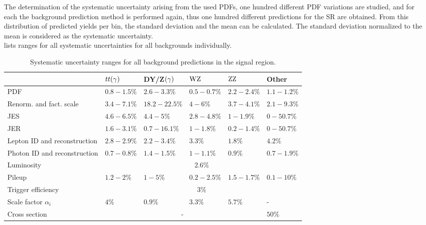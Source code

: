 The determination of the systematic uncertainty arising from the used PDFs, one hundred different PDF variations are studied, and for each the background prediction method is performed again, thus one hundred different predictions for the SR are obtained. From this distribution of predicted yields per bin, the standard deviation and the mean can be calculated. The standard deviation normalized to the mean is considered as the systematic uncertainty.\\
 lists ranges for all systematic uncertainties for all backgrounds individually.
\begin{table}[htb]
 \centering
 \caption{Systematic uncertainty ranges for all background predictions in the signal region.}
 \small
 \label{tab:systuncBKG}
 \begin{tabular}[width=\textwidth]{llllll}
                               & $tt(\gamma)$                  & DY/Z$(\gamma)$  & $\mathrm{W}\mathrm{Z}$    & $\mathrm{Z}\mathrm{Z}$    & Other       \\\hline
  PDF                          & $0.8-1.5\%$                 & $2.6-3.3\%$   & $0.5-0.7\%$ & $2.2-2.4\%$ & $1.1-1.2\%$ \\
  Renorm. and fact. scale      & $3.4-7.1\%$                 & $18.2-22.5\%$ & $4-6\%$     & $3.7-4.1\%$ & $2.1-9.3\%$ \\
  JES                          & $4.6-6.5\%$                 & $4.4-5\%$     & $2.8-4.8\%$ & $1-1.9\%$   & $0-50.7\%$  \\
  JER                          & $1.6-3.1\%$                 & $0.7-16.1\%$  & $1-1.8\%$   & $0.2-1.4\%$ & $0-50.7\%$  \\
  Lepton ID and reconstruction & $2.8-2.9\%$                 & $2.2-3.4\%$   & $3.3\%$     & $1.8\%$     & $4.2\%$     \\
  Photon ID and reconstruction & $0.7-0.8\%$                 & $1.4-1.5\%$   & $1-1.1\%$   & $0.9\%$     & $0.7-1.9\%$ \\
  Luminosity                   & \multicolumn{5}{c}{$2.6\%$}                                                           \\
  Pileup                       & $1.2-2\%$                   & $1-5\%$       & $0.2-2.5\%$ & $1.5-1.7\%$ & $0.1-10\%$  \\
  Trigger efficiency           & \multicolumn{5}{c}{$3\%$}                                                             \\
  Scale factor $\alpha_{i}$    & $4\%$                       & $0.9\%$       & $3.3\%$     & $5.7\%$     & -           \\
  Cross section                & \multicolumn{4}{c}{-}       & $50\%$                                                  \\
  \hline
 \end{tabular}
\end{table}
